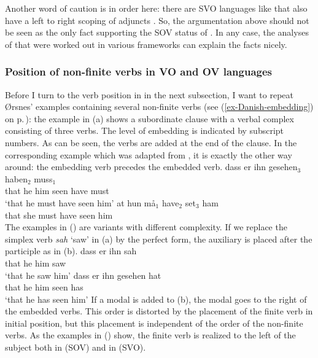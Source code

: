 Another word of caution is in order here: there are SVO languages like  that also have a left
to right scoping of adjuncts \citep[--161]{BGK2004a-u}. So, the argumentation above should not be seen as the only
fact supporting the SOV status of . In any case, the analyses of  that were
worked out in various frameworks can explain the facts nicely.


\subsubsection{Position of non-finite verbs in VO and OV languages}

Before I turn to the verb position in  in the next subsection, I want to repeat Ørsnes'
examples containing several non-finite verbs (see (\ref{ex-Danish-embedding}) on p.\,\pageref{ex-Danish-embedding}): the example in (a) shows a  subordinate clause with a verbal complex consisting of
three verbs. The level of embedding is indicated by subscript numbers. As can be seen, the verbs are
added at the end of the clause. In the corresponding  example which was adapted from \citet[]{Oersnes2009b}, it is exactly the other way
around: the embedding verb precedes the embedded verb.
\eal
\ex
\gll dass er ihn gesehen$_3$ haben$_2$ muss$_1$\\
     that he him seen        have      must\\\german
\glt `that he must have seen him'
\ex
\gll at hun må$_1$ have$_2$ set$_3$ ham\\
     that she must have seen him\\\danish
\zl
%
The examples in () are variants with different complexity. If we replace the simplex verb
\emph{sah} `saw' in (a) by the perfect form, the auxiliary is placed after the participle as
in (b).
\eal
\ex
\gll dass er ihn sah\\
     that he him saw\\\german
\glt `that he saw him'
\ex
\gll dass er ihn gesehen hat\\
     that he him seen    has\\
\glt `that he has seen him'
\zl 
If a modal is added to (b), the modal goes to the right of the embedded verbs. This order is
distorted by the placement of the finite verb in initial position, but this placement is independent
of the order of the non-finite verbs. As the examples in () show, the finite verb is realized
to the left of the subject both in  (SOV) and in  (SVO).

